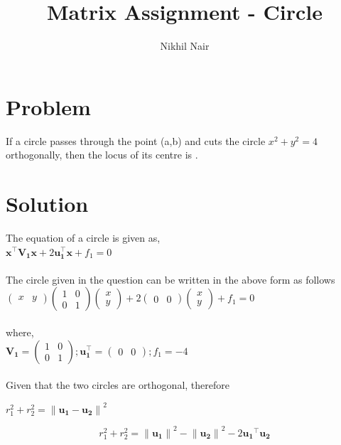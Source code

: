 \documentclass[journal,12pt,twocolumn]{IEEEtran}
\title{\mytitle}
\title{
Matrix Assignment - Circle
}
\author{Nikhil Nair}
\newcommand{\myvec}[1]{\ensuremath{\begin{pmatrix}#1\end{pmatrix}}}
\let\vec\mathbf
\begin{document}
\maketitle
\tableofcontents
\bigskip


\section{\textbf{Problem}}
If  a circle passes through the point (a,b) and cuts the circle $x^2+y^2=4$ orthogonally, then the locus of its centre is .\\


\section{\textbf{Solution}}
The equation of a circle is given as,   \\

${\vec{x^{\top}V_1 x} + 2\vec{u_1^{\top}x}} + f_1=0$
\\
\\
The circle given in the question can be written in the above form as follows
\\

$\myvec{x & y}\myvec{1&0\\ 0&1}\myvec{x\\y} + 2\myvec{0&0}\myvec{x\\y} + f_1 = 0$\\
\\
where,
\\

$\vec{V_1}=\myvec{1&0\\ 0&1} ; \vec{u_1^{\top}}=\myvec{0&0} ; f_1=-4$
\\
\\

Given that the two circles are orthogonal, therefore
\\
\begin{center}
$r_1^2 + r_2^2 = {\lVert \vec{u_1} - \vec{u_2} \rVert}^2$
\end{center}

\begin{equation}
r_1^2 + r_2^2 = {\lVert \vec{u_1} \rVert}^2 -{\lVert \vec{u_2} \rVert}^2 -2 \vec{ u_1}^{\top}\vec{u_2} \label{eq-1}
\end{equation}
\end{document}
